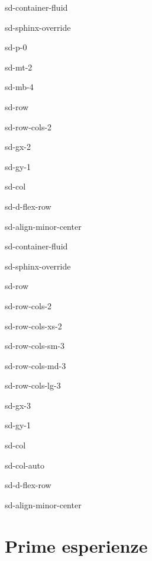 \documentclass[letterpaper,10pt,english]{jupyterBook}
\begin{document}
\begin{sphinxuseclass}{sd-container-fluid}
\begin{sphinxuseclass}{sd-sphinx-override}
\begin{sphinxuseclass}{sd-p-0}
\begin{sphinxuseclass}{sd-mt-2}
\begin{sphinxuseclass}{sd-mb-4}
\begin{sphinxuseclass}{sd-row}
\begin{sphinxuseclass}{sd-row-cols-2}
\begin{sphinxuseclass}{sd-gx-2}
\begin{sphinxuseclass}{sd-gy-1}
\begin{sphinxuseclass}{sd-col}
\begin{sphinxuseclass}{sd-d-flex-row}
\begin{sphinxuseclass}{sd-align-minor-center}
\begin{sphinxuseclass}{sd-container-fluid}
\begin{sphinxuseclass}{sd-sphinx-override}
\begin{sphinxuseclass}{sd-row}
\begin{sphinxuseclass}{sd-row-cols-2}
\begin{sphinxuseclass}{sd-row-cols-xs-2}
\begin{sphinxuseclass}{sd-row-cols-sm-3}
\begin{sphinxuseclass}{sd-row-cols-md-3}
\begin{sphinxuseclass}{sd-row-cols-lg-3}
\begin{sphinxuseclass}{sd-gx-3}
\begin{sphinxuseclass}{sd-gy-1}
\begin{sphinxuseclass}{sd-col}
\begin{sphinxuseclass}{sd-col-auto}
\begin{sphinxuseclass}{sd-d-flex-row}
\begin{sphinxuseclass}{sd-align-minor-center}
\end{sphinxuseclass}
\end{sphinxuseclass}
\end{sphinxuseclass}
\end{sphinxuseclass}
\end{sphinxuseclass}
\end{sphinxuseclass}
\end{sphinxuseclass}
\end{sphinxuseclass}
\end{sphinxuseclass}
\end{sphinxuseclass}
\end{sphinxuseclass}
\end{sphinxuseclass}
\end{sphinxuseclass}
\end{sphinxuseclass}
\end{sphinxuseclass}
\end{sphinxuseclass}
\end{sphinxuseclass}
\end{sphinxuseclass}
\end{sphinxuseclass}
\end{sphinxuseclass}
\end{sphinxuseclass}
\end{sphinxuseclass}
\end{sphinxuseclass}
\end{sphinxuseclass}
\end{sphinxuseclass}
\end{sphinxuseclass}

\chapter{Prime esperienze}
\label{\detokenize{ch/experiments:prime-esperienze}}\label{\detokenize{ch/experiments:classical-electromagnetism-first-experiments}}\label{\detokenize{ch/experiments::doc}}
\sphinxstepscope
\end{document}
